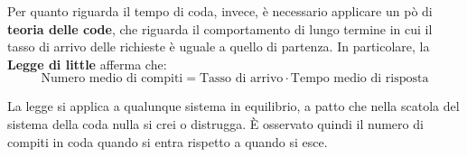 \noindent Per quanto riguarda il tempo di coda, invece, è necessario applicare un pò di \textbf{teoria delle code}, che riguarda il comportamento di
lungo termine in cui il tasso di arrivo delle richieste è uguale a quello di partenza. In particolare, la \textbf{Legge di little} afferma che: \[
    \text{Numero medio di compiti} = \text{Tasso di arrivo} \cdot \text{Tempo medio di risposta}
\]

\noindent La legge si applica a qualunque sistema in equilibrio, a patto che nella scatola del sistema della coda nulla si crei o distrugga. È osservato
quindi il numero di compiti in coda quando si entra rispetto a quando si esce.